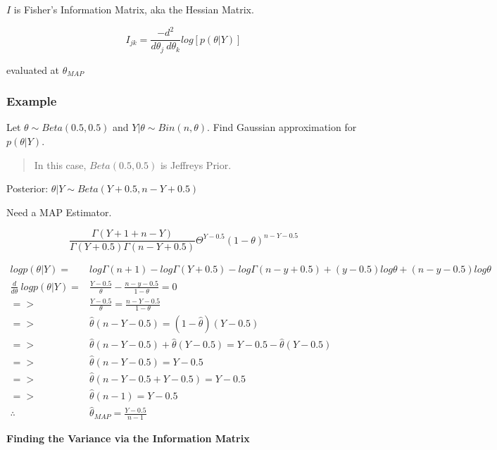 \documentclass[11pt]{article}
\begin{document}
\(I\) is Fisher's Information Matrix, aka the Hessian Matrix.

$$
I_{jk} = \frac{- d^2}{d \theta_j \ d \theta_k} log[p(\theta | Y)]
$$

evaluated at \(\hat \theta_{MAP}\)

\subsubsection{Example}
\label{sec:org27d2bfe}

Let \(\theta \sim Beta(0.5, 0.5)\) and \(Y | \theta \sim Bin(n, \theta)\). Find
Gaussian approximation for \(p(\theta | Y)\).

\begin{quote}
In this case, \(Beta(0.5, 0.5)\) is Jeffreys Prior.
\end{quote}

Posterior: \(\theta | Y \sim Beta(Y + 0.5, n - Y + 0.5)\)

Need a MAP Estimator.

$$
\frac{\Gamma (Y + 1 + n - Y)}{\Gamma (Y + 0.5) \Gamma (n - Y + 0.5)} \Theta^{Y -
0.5} (1 - \theta)^{n - Y - 0.5}
$$

\begin{equation}
\begin{split}
log p (\theta | Y) = & log \Gamma (n + 1) - log \Gamma (Y + 0.5) - log \Gamma (n - y + 0.5) + (y - 0.5) log \theta + (n - y - 0.5) log \theta\\
\frac{d}{d \theta} \ log p(\theta | Y) = & \frac{Y - 0.5}{\theta} - \frac{n - y - 0.5}{1 - \theta} = 0\\
=> & \frac{Y - 0.5}{\theta} = \frac{n - Y - 0.5}{1 - \theta}\\
=> & \hat \theta (n - Y - 0.5) = (1 - \hat \theta)(Y - 0.5)\\
=> & \hat \theta (n - Y - 0.5) + \hat \theta (Y - 0.5) = Y - 0.5 - \hat \theta (Y - 0.5)\\
=> & \hat \theta (n - Y - 0.5) = Y - 0.5\\
=> & \hat \theta (n - Y - 0.5 + Y - 0.5) = Y - 0.5\\
=> & \hat \theta (n - 1) = Y - 0.5\\
\therefore & \hat \theta_{MAP} = \frac{Y - 0.5}{n - 1}
\end{split}
\end{equation}


\textbf{Finding the Variance via the Information Matrix}
\end{document}
